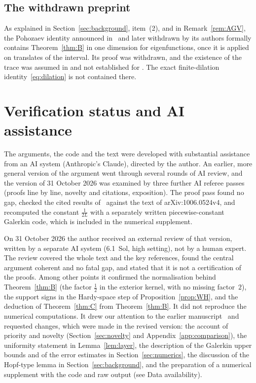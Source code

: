 \documentclass[11pt]{amsart}
\theoremstyle{definition}
\theoremstyle{remark}
\numberwithin{equation}{section}
\begin{document}
\subsection*{The withdrawn preprint \texorpdfstring{\cite{AGV24}}{[AGV24]}}
As explained in Section~\ref{sec:background}, item~(2), and in Remark~\ref{rem:AGV}, the Pohozaev identity announced in~\cite{AGV24} and later withdrawn by its authors formally contains Theorem~\ref{thm:B} in one dimension for eigenfunctions, once it is applied on translates of the interval. Its proof was withdrawn, and the existence of the trace was assumed in \cite[Thm.~2.3]{AGV24} and not established for \cite[Cor.~3.8]{AGV24}. The exact finite-dilation identity~\eqref{eq:dilation} is not contained there.

\section*{Verification status and AI assistance}
The arguments, the code and the text were developed with substantial assistance from an AI system (Anthropic's Claude), directed by the author. An earlier, more general version of the argument went through several rounds of AI review, and the version of 31 October 2026 was examined by three further AI referee passes (proofs line by line, novelty and citations, exposition). The proof pass found no gap, checked the cited results of~\cite{Kw11} against the text of arXiv:1006.0524v4, and recomputed the constant $\frac1{2L}$ with a separately written piecewise-constant Galerkin code, which is included in the numerical supplement.

On 31 October 2026 the author received an external review of that version, written by a separate AI system (6.1~Sol, high setting), not by a human expert. The review covered the whole text and the key references, found the central argument coherent and no fatal gap, and stated that it is not a certification of the proofs. Among other points it confirmed the normalisation behind Theorem~\ref{thm:B} (the factor $\frac12$ in the exterior kernel, with no missing factor~$2$), the support signs in the Hardy-space step of Proposition~\ref{prop:WH}, and the deduction of Theorem~\ref{thm:C} from Theorem~\ref{thm:B}. It did not reproduce the numerical computations. It drew our attention to the earlier manuscript~\cite{BT26} and requested changes, which were made in the revised version: the account of priority and novelty (Section~\ref{sec:novelty} and Appendix~\ref{app:comparison}), the uniformity statement in Lemma~\ref{lem:layer}, the description of the Galerkin upper bounds and of the error estimates in Section~\ref{sec:numerics}, the discussion of the Hopf-type lemma in Section~\ref{sec:background}, and the preparation of a numerical supplement with the code and raw output (see Data availability).
\end{document}
